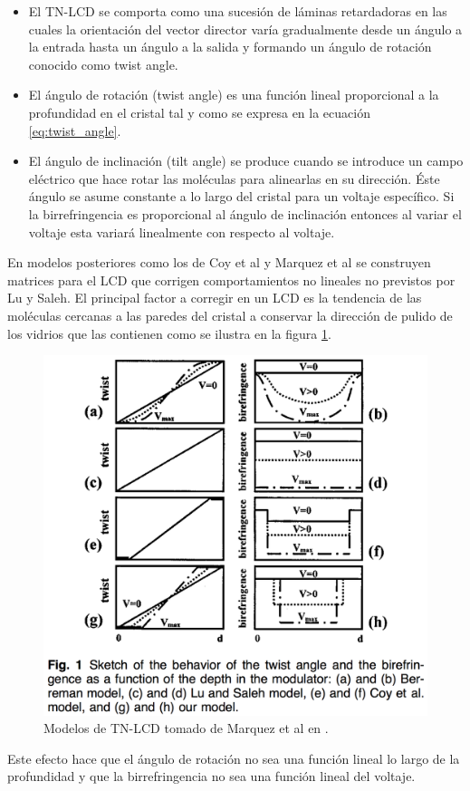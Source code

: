 \begin{itemize}
\item El TN-LCD se comporta como una sucesión de  láminas
  retardadoras en las cuales la orientación del vector director varía
  gradualmente desde un ángulo a la entrada hasta un ángulo a la
  salida y formando un ángulo de rotación conocido como twist angle. 
\item El ángulo de rotación (twist angle) es una función lineal
  proporcional a la profundidad en el cristal tal y como se expresa en
  la ecuación \ref{eq:twist_angle}.
\item El ángulo de inclinación (tilt angle) se produce cuando se
  introduce un campo eléctrico que hace rotar las moléculas para
  alinearlas en su dirección. Éste ángulo se asume constante a lo
  largo del cristal para un voltaje específico. Si la birrefringencia
  es proporcional al ángulo de inclinación entonces al variar el
  voltaje esta variará linealmente con respecto al voltaje.
\end{itemize}

En modelos posteriores como los de Coy et al  y Marquez
et al  se construyen matrices para el LCD que corrigen
comportamientos no lineales no previstos por  Lu y Saleh. El
principal factor a corregir en un LCD es la tendencia de las moléculas
cercanas a las paredes del cristal a conservar la dirección de pulido
de los vidrios que las contienen como se ilustra en la figura \ref{fig:lcd_models}.
\begin{figure}[h!]
\centering
\includegraphics[scale=.5]{lcd_models}
\caption[Modelos de TN-LCD]{Modelos de TN-LCD tomado de Marquez et al en .}
\label{fig:lcd_models}
\end{figure}
 Este efecto hace que el ángulo de
rotación no sea una función lineal  lo largo de la profundidad y que la
birrefringencia no sea una función lineal del voltaje.


